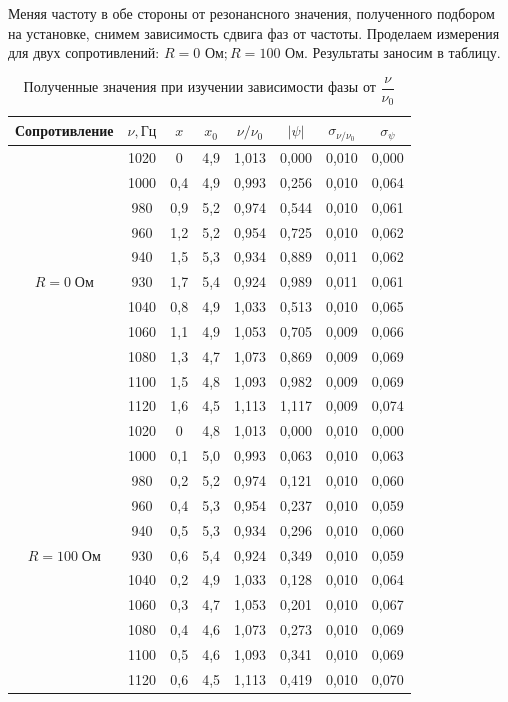 \documentclass[a4paper, 12pt]{article}
\begin{document}
Меняя частоту в обе стороны от резонансного значения, полученного подбором на установке, снимем зависимость сдвига фаз от частоты. Проделаем измерения для двух сопротивлений: $R=0\text{ Ом}; R=100\text{ Ом}$. Результаты заносим в таблицу.
\begin{table}[H]
\centering
\begin{tabular}{|c|c|c|c|c|c|c|c|}
\hline
Сопротивление & $\nu, \text{Гц}$ & $x$ & $x_0$ & $\nu/\nu_0$ & $|\psi|$ &$\sigma_{\nu/\nu_0}$& $\sigma_{\psi}$\\ \hline
\multirow{11}{*}{$R = 0 \; \text{Ом}$}   
										 &1020	&0		&4,9	&1,013	&0,000	&0,010	&0,000 \\ \cline{2-8}
										 &1000	&0,4	&4,9	&0,993	&0,256	&0,010	&0,064 \\ \cline{2-8} 
										 &980	&0,9	&5,2	&0,974	&0,544	&0,010	&0,061 \\ \cline{2-8} 
										 &960	&1,2	&5,2	&0,954	&0,725	&0,010	&0,062 \\ \cline{2-8} 
										 &940	&1,5	&5,3	&0,934	&0,889	&0,011	&0,062 \\ \cline{2-8} 
										 &930	&1,7	&5,4	&0,924	&0,989	&0,011	&0,061 \\ \cline{2-8}
										 &1040	&0,8	&4,9	&1,033	&0,513	&0,010	&0,065 \\ \cline{2-8} 
										 &1060	&1,1	&4,9	&1,053	&0,705	&0,009	&0,066 \\ \cline{2-8} 
										 &1080	&1,3	&4,7	&1,073	&0,869	&0,009	&0,069 \\ \cline{2-8} 
										 &1100	&1,5	&4,8	&1,093	&0,982	&0,009	&0,069 \\ \cline{2-8} 
										 &1120	&1,6	&4,5	&1,113	&1,117	&0,009	&0,074 \\ \hline 
\multirow{13}{*}{$R = 100 \; \text{Ом}$} 
										&1020	&0		&4,8	&1,013	&0,000	&0,010	&0,000\\ \cline{2-8}
										&1000	&0,1	&5,0	&0,993	&0,063	&0,010	&0,063\\ \cline{2-8}
										&980	&0,2	&5,2	&0,974	&0,121	&0,010	&0,060\\ \cline{2-8}
										&960	&0,4	&5,3	&0,954	&0,237	&0,010	&0,059\\ \cline{2-8}
										&940	&0,5	&5,3	&0,934	&0,296	&0,010	&0,060\\ \cline{2-8}
										&930	&0,6	&5,4	&0,924	&0,349	&0,010	&0,059\\ \cline{2-8}
										&1040	&0,2	&4,9	&1,033	&0,128	&0,010	&0,064\\ \cline{2-8}
										&1060	&0,3	&4,7	&1,053	&0,201	&0,010	&0,067\\ \cline{2-8}
										&1080	&0,4	&4,6	&1,073	&0,273	&0,010	&0,069\\ \cline{2-8}
										&1100	&0,5	&4,6	&1,093	&0,341	&0,010	&0,069\\ \cline{2-8}
										&1120	&0,6	&4,5	&1,113	&0,419	&0,010	&0,070 \\ \hline 
\end{tabular}
\caption{Полученные значения при изучении зависимости фазы от $\dfrac{\nu}{\nu_0}$}
\end{table}
\end{document}
